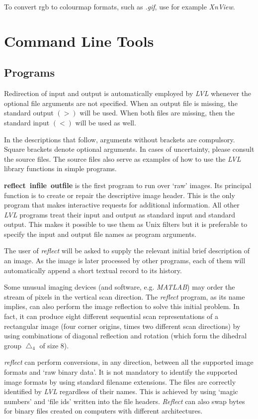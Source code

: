 \documentclass[11pt,twoside,english,a4paper]{article}
\begin{document}
To convert rgb to colourmap formats, such as \emph{.gif}, use for example \emph{XnView}. 

\section{Command Line Tools}
\subsection{Programs}
Redirection of input and output is automatically employed by \emph{LVL} whenever the
optional file arguments are not specified. When an output file is missing, 
the standard output $(>)$ will be used. When both
files are missing, then the standard input $(<)$  will be used as well.

In the descriptions that follow, arguments without brackets are compulsory. 
Square brackets denote optional arguments. In cases of uncertainty, 
please consult the source files. The source files also serve as examples
of how to use the \emph{LVL} library functions in simple programs.

\textbf{{reflect~infile~outfile}} is the first program to run over `raw' images.
Its principal function is to create or repair the descriptive
image header. This is the only program that makes interactive requests
for additional information. All other \emph{LVL} programs treat their input
and output as standard input and standard output. This makes it possible
to use them as Unix filters but it is preferable to specify the input
and output file names as program arguments.

The user of \emph{reflect} will be asked to supply the relevant initial
brief description of an image. As the image is later processed by other
programs, each of them will automatically append a short textual record
to its history.

Some unusual imaging devices (and software, 
e.g. \emph{MATLAB}) may order the stream of pixels in the
vertical scan direction. The \textit{reflect} program, as its name
implies, can also perform the image reflection to solve this initial
problem. In fact, it can produce eight  different sequential scan representations of a
rectangular image (four corner origins, times two different scan directions) by using combinations of diagonal reflection and rotation
(which form the dihedral group $\bigtriangleup_4$ of size 8).

\textit{reflect} can perform conversions, in any direction, between all the supported image formats and `raw binary data'. 
It is not mandatory to identify the supported image formats by using standard filename extensions. The files
are correctly identified by \emph{LVL} regardless of their names. This is achieved by using `magic numbers' and `file ids' written into the file headers. \emph{Reflect} can also swap bytes for binary files created on computers with different architectures.
\end{document}
